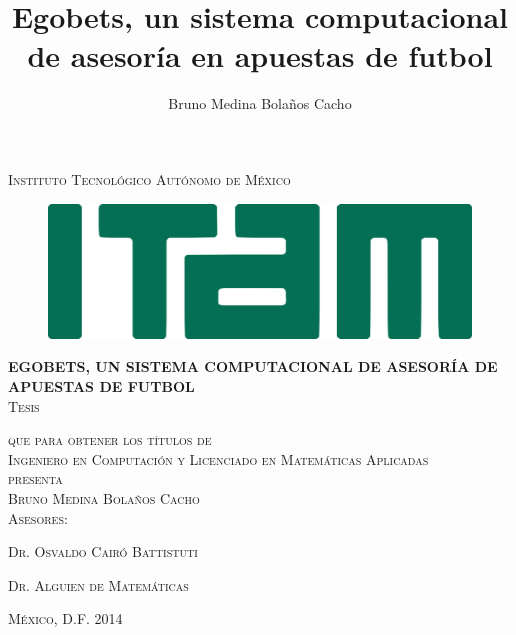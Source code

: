 
\title{Egobets, un sistema computacional de asesoría en apuestas de futbol}
\author{Bruno Medina Bolaños Cacho}

\begin{titlepage}
\begin{center}

\textsc{\Large Instituto Tecnológico Autónomo de México}\\[3em]

\begin{figure}[h]
\begin{center}
\includegraphics{resources/logo-ITAM}
\end{center}
\end{figure}

\vspace{2em}

\textsc\huge\textbf{EGOBETS, UN SISTEMA COMPUTACIONAL DE ASESORÍA DE APUESTAS DE FUTBOL}\\[3em]


\textsc{\large Tesis}

\textsc{que para obtener los títulos de}\\[1em]

\textsc{Ingeniero en Computación y Licenciado en Matemáticas Aplicadas}\\[1em]

\textsc{presenta}\\[1em]

\textsc{\Large Bruno Medina Bolaños Cacho}\\[1em]

\textsc{\large Asesores:}

\textsc{\large Dr. Osvaldo Cairó Battistuti}

\textsc{\large Dr. Alguien de Matemáticas}\\[1em]

\end{center}

\vspace*{\fill}
\textsc{México, D.F. \hspace*{\fill} 2014}

\end{titlepage}

